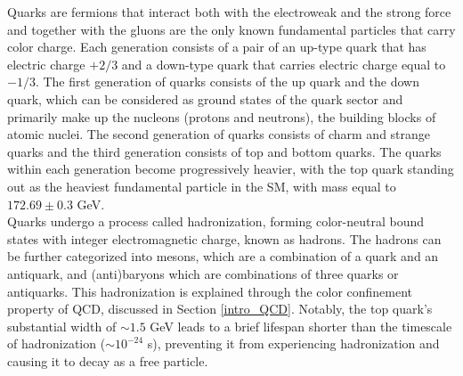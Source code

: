 Quarks are fermions that interact both with the electroweak and the strong force and together with the gluons are the only known fundamental particles that carry color charge. Each generation consists of a pair of an up-type quark that has electric charge $+2/3$ and a down-type quark that carries electric charge equal to $-1/3$. The first generation of quarks consists of the up quark and the down quark, which can be considered as ground states of the quark sector and primarily make up the nucleons (protons and neutrons), the building blocks of atomic nuclei. The second generation of quarks consists of charm and strange quarks and the third generation consists of top and bottom quarks. The quarks within each generation become progressively heavier, with the top quark standing out as the heaviest fundamental particle in the SM, with mass equal to $172.69 \pm 0.3$ GeV.\\ 
\indent Quarks undergo a process called hadronization, forming color-neutral bound states with integer electromagnetic charge, known as hadrons. The hadrons can be further categorized into mesons, which are a combination of a quark and an antiquark, and (anti)baryons which are combinations of three quarks or antiquarks. This hadronization is explained through the color confinement property of QCD, discussed in Section \ref{intro_QCD}. Notably, the top quark's substantial width of $\sim 1.5$ GeV leads to a brief lifespan shorter than the timescale of hadronization ($\sim 10^{-24}$ s), preventing it from experiencing hadronization and causing it to decay as a free particle.\\

